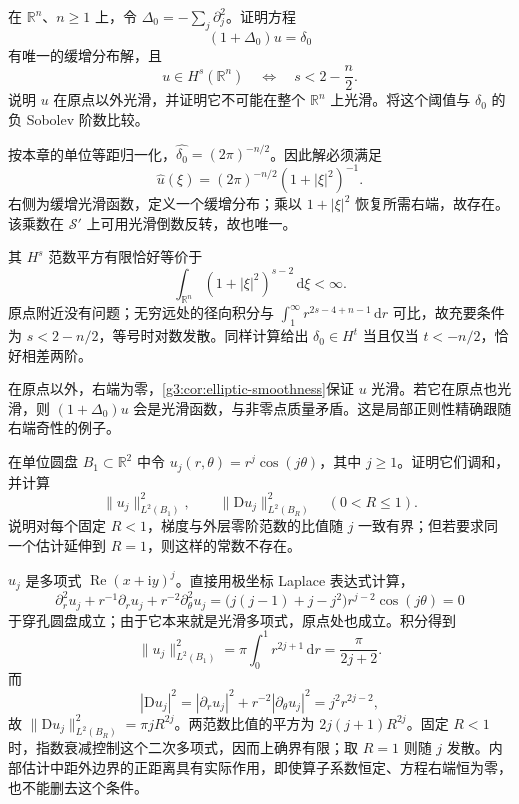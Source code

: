 \begin{exercise}\label{g3:ex:point-source-sobolev-threshold}
	在 \(\mathbb R^n\)、\(n\ge1\) 上，令 \(\Delta_0=-\sum_j\partial_j^2\)。证明方程
	\[
		(1+\Delta_0)u=\delta_0
	\]
	有唯一的缓增分布解，且
	\[
		u\in H^s(\mathbb R^n)\quad\Longleftrightarrow\quad s<2-\frac n2.
	\]
	说明 \(u\) 在原点以外光滑，并证明它不可能在整个 \(\mathbb R^n\) 上光滑。将这个阈值与 \(\delta_0\) 的负 Sobolev 阶数比较。
\end{exercise}
\begin{solution}
	按本章的单位等距归一化，\(\widehat{\delta_0}=(2\pi)^{-n/2}\)。因此解必须满足
	\[
		\widehat u(\xi)=(2\pi)^{-n/2}(1+|\xi|^2)^{-1}.
	\]
	右侧为缓增光滑函数，定义一个缓增分布；乘以 \(1+|\xi|^2\) 恢复所需右端，故存在。该乘数在 \(\mathcal S'\) 上可用光滑倒数反转，故也唯一。

	其 \(H^s\) 范数平方有限恰好等价于
	\[
		\int_{\mathbb R^n}(1+|\xi|^2)^{s-2}\,\mathrm d\xi<\infty.
	\]
	原点附近没有问题；无穷远处的径向积分与
	\(\int_1^\infty r^{2s-4+n-1}\,\mathrm dr\) 可比，故充要条件为 \(s<2-n/2\)，等号时对数发散。同样计算给出 \(\delta_0\in H^t\) 当且仅当 \(t<-n/2\)，恰好相差两阶。

	在原点以外，右端为零，\cref{g3:cor:elliptic-smoothness}保证 \(u\) 光滑。若它在原点也光滑，则 \((1+\Delta_0)u\) 会是光滑函数，与非零点质量矛盾。这是局部正则性精确跟随右端奇性的例子。
\end{solution}

\begin{exercise}\label{g3:ex:interior-distance-constant}
	在单位圆盘 \(B_1\subset\mathbb R^2\) 中令
	\(u_j(r,\theta)=r^j\cos(j\theta)\)，其中 \(j\ge1\)。证明它们调和，并计算
	\[
		\|u_j\|_{L^2(B_1)}^2,\qquad
		\|\mathrm Du_j\|_{L^2(B_R)}^2
		\quad(0<R\le1).
	\]
	说明对每个固定 \(R<1\)，梯度与外层零阶范数的比值随 \(j\) 一致有界；但若要求同一个估计延伸到 \(R=1\)，则这样的常数不存在。
\end{exercise}
\begin{solution}
	\(u_j\) 是多项式 \(\operatorname{Re}(x+\mathrm iy)^j\)。直接用极坐标 Laplace 表达式计算，
	\[
		\partial_r^2u_j+r^{-1}\partial_ru_j+r^{-2}\partial_\theta^2u_j
		=\bigl(j(j-1)+j-j^2\bigr)r^{j-2}\cos(j\theta)=0
	\]
	于穿孔圆盘成立；由于它本来就是光滑多项式，原点处也成立。积分得到
	\[
		\|u_j\|_{L^2(B_1)}^2
		=\pi\int_0^1r^{2j+1}\,\mathrm dr=\frac{\pi}{2j+2}.
	\]
	而
	\[
		|\mathrm Du_j|^2
		=|\partial_ru_j|^2+r^{-2}|\partial_\theta u_j|^2
		=j^2r^{2j-2},
	\]
	故 \(\|\mathrm Du_j\|_{L^2(B_R)}^2=\pi jR^{2j}\)。两范数比值的平方为 \(2j(j+1)R^{2j}\)。固定 \(R<1\) 时，指数衰减控制这个二次多项式，因而上确界有限；取 \(R=1\) 则随 \(j\) 发散。内部估计中距外边界的正距离具有实际作用，即使算子系数恒定、方程右端恒为零，也不能删去这个条件。
\end{solution}

